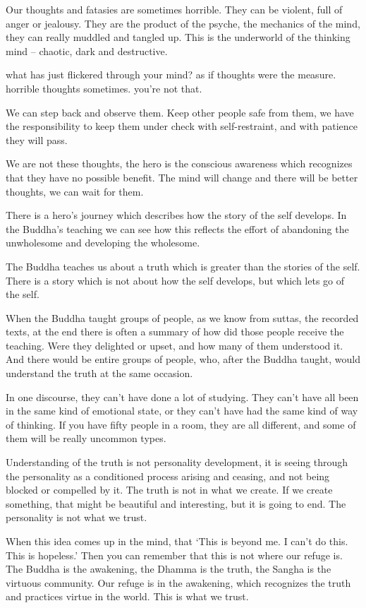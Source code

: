 Our thoughts and fatasies are sometimes horrible. They can be violent,
full of anger or jealousy. They are the product of the psyche, the
mechanics of the mind, they can really muddled and tangled up. This is
the underworld of the thinking mind -- chaotic, dark and destructive.

what has just flickered through your mind? as if thoughts were the
measure. horrible thoughts sometimes. you're not that.

We can step back and observe them. Keep other people safe from them, we
have the responsibility to keep them under check with self-restraint,
and with patience they will pass.

We are not these thoughts, the hero is the conscious awareness which
recognizes that they have no possible benefit. The mind will change and
there will be better thoughts, we can wait for them.

There is a hero's journey which describes how the story of the self
develops. In the Buddha's teaching we can see how this reflects the
effort of abandoning the unwholesome and developing the wholesome.

The Buddha teaches us about a truth which is greater than the stories of
the self. There is a story which is not about how the self develops, but
which lets go of the self.

When the Buddha taught groups of people, as we know from suttas, the
recorded texts, at the end there is often a summary of how did those
people receive the teaching. Were they delighted or upset, and how many
of them understood it. And there would be entire groups of people, who,
after the Buddha taught, would understand the truth at the same
occasion.

In one discourse, they can't have done a lot of studying. They can't
have all been in the same kind of emotional state, or they can't have
had the same kind of way of thinking. If you have fifty people in a
room, they are all different, and some of them will be really uncommon
types.

Understanding of the truth is not personality development, it is seeing
through the personality as a conditioned process arising and ceasing,
and not being blocked or compelled by it. The truth is not in what we
create. If we create something, that might be beautiful and interesting,
but it is going to end. The personality is not what we trust.

When this idea comes up in the mind, that `This is beyond me. I can't do
this. This is hopeless.' Then you can remember that this is not where
our refuge is. The Buddha is the awakening, the Dhamma is the truth, the
Sangha is the virtuous community. Our refuge is in the awakening, which
recognizes the truth and practices virtue in the world. This is what we
trust.

